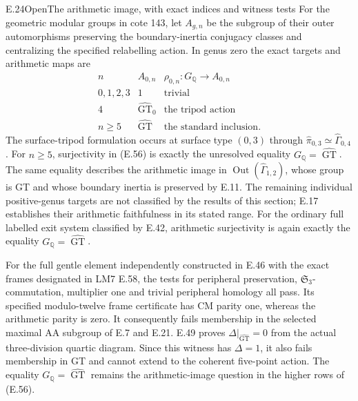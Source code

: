 \begin{result}{E.24}{Open}{The arithmetic image, with exact indices and witness tests}
For the geometric modular groups in cote 143, let
$A_{g,n}$ be the subgroup of their outer automorphisms
preserving the boundary-inertia conjugacy classes and
centralizing the specified relabelling action.  In genus
zero the exact targets and arithmetic maps are
\[
\begin{array}{c|c|c}
 n& A_{0,n}&\rho_{0,n}:G_{\mathbb Q}\longrightarrow A_{0,n}\\\hline
 0,1,2,3&1&\text{trivial}\\
 4&\widehat{\operatorname{GT}}_0&\text{the tripod action}\\
 n\geq5&\widehat{\operatorname{GT}}&\text{the standard inclusion}.
\end{array}                                                     \tag{E.56}
\]
The surface-tripod formulation occurs at surface type
$(0,3)$ through
$\widehat\pi_{0,3}\simeq\widehat\Gamma_{0,4}$.
For $n\geq5$, surjectivity in (E.56) is exactly the
unresolved equality $G_{\mathbb Q}=\widehat{\operatorname{GT}}$.
The same equality describes the arithmetic image in
$\operatorname{Out}(\widehat\Gamma_{1,2})$, whose group
is GT and whose boundary inertia is preserved by E.11.
The remaining individual positive-genus targets are not
classified by the results of this section; E.17 establishes
their arithmetic faithfulness in its stated range. For the
ordinary full labelled exit system classified by E.42,
arithmetic surjectivity is again exactly the equality
$G_{\mathbb Q}=\widehat{\operatorname{GT}}$.

For the full gentle element independently constructed
in E.46 with the exact frames designated in LM7 E.58, the tests for
peripheral preservation, $\mathfrak S_3$-commutation,
multiplier one and trivial peripheral homology all pass.
Its specified modulo-twelve frame certificate has CM
parity one, whereas the arithmetic parity is zero.
It consequently fails membership in the selected maximal
AA subgroup of E.7 and E.21. E.49 proves
$\Delta|_{\widehat{\operatorname{GT}}}=0$ from the actual
three-division quartic diagram. Since this witness has
$\Delta=1$, it also fails membership in GT and cannot
extend to the coherent five-point action. The equality
$G_{\mathbb Q}=\widehat{\operatorname{GT}}$ remains the
arithmetic-image question in the higher rows of (E.56).
\end{result}
